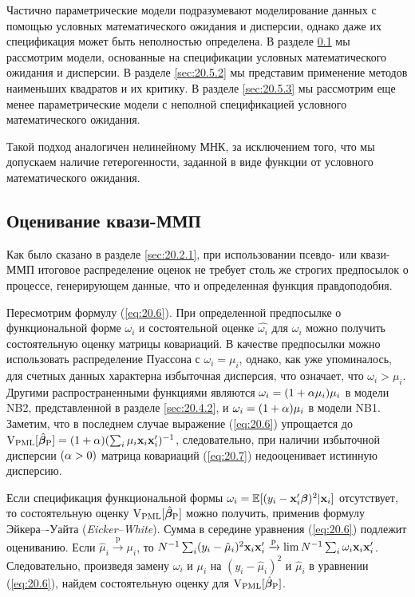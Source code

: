\noindent
Частично параметрические модели подразумевают моделирование данных с помощью условных математического ожидания и дисперсии, однако даже их спецификация может быть неполностью определена. В разделе \ref{sec:20.5.1} мы рассмотрим модели, основанные на спецификации условных математического ожидания и дисперсии. В разделе \ref{sec:20.5.2} мы представим применение методов наименьших квадратов и их критику. В разделе \ref{sec:20.5.3} мы рассмотрим еще менее параметрические модели с неполной спецификацией условного математического ожидания.

Такой подход аналогичен нелинейному МНК, за исключением того, что мы допускаем наличие гетерогенности, заданной в виде функции от условного математического ожидания.


\subsection{Оценивание квази-ММП}\label{sec:20.5.1}

\noindent
Как было сказано в разделе \ref{sec:20.2.1}, при использовании псевдо- или квази-ММП итоговое распределение оценок не требует столь же строгих предпосылок о процессе, генерирующем данные, что и определенная функция правдоподобия.

Пересмотрим формулу (\ref{eq:20.6}). При определенной предпосылке о функциональной форме $\omega_i$ и состоятельной оценке $\hat{\omega_i}$ для $\omega_i$ можно получить состоятельную оценку матрицы ковариаций. В качестве предпосылки можно использовать распределение Пуассона с $\omega_i = \mu_i$, однако, как уже упоминалось, для счетных данных характерна избыточная дисперсия, что означает, что $\omega_i > \mu_i$. Другими распространенными функциями являются $\omega_i = (1 + \alpha \mu_i) \mu_i$ в модели NB2, представленной в разделе \ref{sec:20.4.2}, и $\omega_i = (1 + \alpha) \mu_i$ в модели NB1. Заметим, что в последнем случае выражение (\ref{eq:20.6}) упрощается до $\mathrm{V}_{\mathrm{PML}}[\hat{\bm{\beta}}_{\mathrm{P}}] = (1 + \alpha) (\sum_i \mu_i \mathbf{x}_i \mathbf{x}'_i)^{-1}$, следовательно, при наличии избыточной дисперсии $(\alpha > 0)$ матрица ковариаций (\ref{eq:20.7}) недооценивает истинную дисперсию.

Если спецификация функциональной формы $\omega_i = \mathbb{E}[(y_i - \mathbf{x}_i'\bm{\beta})^2|\mathbf{x}_i]$ отсутствует, то состоятельную оценку $\mathrm{V}_{\mathrm{PML}}[\hat{\bm{\beta}}_{\mathrm{P}}]$ можно получить, применив формулу Эйкера–-Уайта (\textit{Eicker--White}). Сумма в середине уравнения (\ref{eq:20.6}) подлежит оцениванию. Если $\hat{\mu}_i \xrightarrow{\text{p}} \mu_i$, то $N^{-1} \sum_i (y_i - \hat{\mu}_i)^2 \mathbf{x}_i \mathbf{x}'_i \xrightarrow{\text{p}} \lim N^{-1} \sum_i \omega_i \mathbf{x}_i \mathbf{x}'_i$. Следовательно, произведя замену $\omega_i$ и $\mu_i$ на $(y_i - \hat{\mu}_i)^2$ и $\hat{\mu}_i$ в уравнении (\ref{eq:20.6}), найдем состоятельную оценку для $\mathrm{V}_{\mathrm{PML}}[\hat{\bm{\beta}}_{\mathrm{P}}]$.

